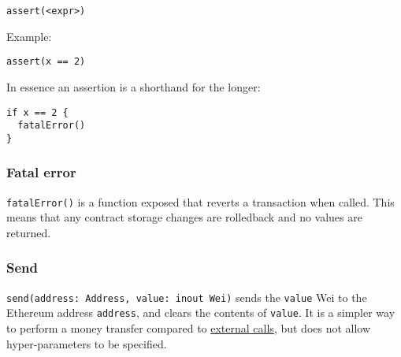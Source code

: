 \begin{verbatim}
assert(<expr>)
\end{verbatim}

Example:

\begin{verbatim}
assert(x == 2)
\end{verbatim}

In essence an assertion is a shorthand for the longer:

\begin{verbatim}
if x == 2 {
  fatalError()
}
\end{verbatim}

\subsubsection{Fatal error}
\label{sec:appendix-b-fatal-error}

\texttt{fatalError()} is a function exposed that reverts a transaction when called. This means that any contract storage changes are rolledback and no values are returned.

\subsubsection{Send}
\label{sec:appendix-b-send}

\texttt{send(address: Address, value: inout Wei)} sends the \texttt{value} Wei to the Ethereum address \texttt{address}, and clears the contents of \texttt{value}. It is a simpler way to perform a money transfer compared to \hyperref[sec:appendix-b-external-calls]{external calls}, but does not allow hyper-parameters to be specified.
